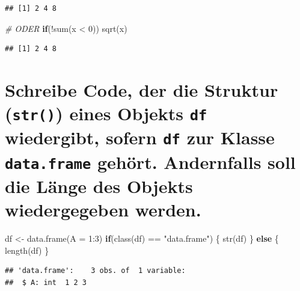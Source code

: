 \documentclass[12pt,a4paper]{article}
\newenvironment{Shaded}{\begin{snugshade}}{\end{snugshade}}
\newcommand{\AttributeTok}[1]{\textcolor[rgb]{0.77,0.63,0.00}{#1}}
\newcommand{\CommentTok}[1]{\textcolor[rgb]{0.56,0.35,0.01}{\textit{#1}}}
\newcommand{\ControlFlowTok}[1]{\textcolor[rgb]{0.13,0.29,0.53}{\textbf{#1}}}
\newcommand{\DecValTok}[1]{\textcolor[rgb]{0.00,0.00,0.81}{#1}}
\newcommand{\FunctionTok}[1]{\textcolor[rgb]{0.00,0.00,0.00}{#1}}
\newcommand{\NormalTok}[1]{#1}
\newcommand{\OtherTok}[1]{\textcolor[rgb]{0.56,0.35,0.01}{#1}}
\newcommand{\SpecialCharTok}[1]{\textcolor[rgb]{0.00,0.00,0.00}{#1}}
\newcommand{\StringTok}[1]{\textcolor[rgb]{0.31,0.60,0.02}{#1}}
\begin{document}
\begin{verbatim}
## [1] 2 4 8
\end{verbatim}

\begin{Shaded}
\begin{Highlighting}[]
    \CommentTok{\# ODER}
    \ControlFlowTok{if}\NormalTok{(}\SpecialCharTok{!}\FunctionTok{sum}\NormalTok{(x }\SpecialCharTok{\textless{}} \DecValTok{0}\NormalTok{)) }\FunctionTok{sqrt}\NormalTok{(x)}
\end{Highlighting}
\end{Shaded}

\begin{verbatim}
## [1] 2 4 8
\end{verbatim}

\hypertarget{schreibe-code-der-die-struktur-eines-objekts-wiedergibt-sofern-zur-klasse-gehuxf6rt.-andernfalls-soll-die-luxe4nge-des-objekts-wiedergegeben-werden.}{%
\section{\texorpdfstring{Schreibe Code, der die Struktur
(\texttt{str()}) eines Objekts \texttt{df} wiedergibt, sofern
\texttt{df} zur Klasse \texttt{data.frame} gehört. Andernfalls soll die
Länge des Objekts wiedergegeben
werden.}{Schreibe Code, der die Struktur () eines Objekts  wiedergibt, sofern  zur Klasse  gehört. Andernfalls soll die Länge des Objekts wiedergegeben werden.}}\label{schreibe-code-der-die-struktur-eines-objekts-wiedergibt-sofern-zur-klasse-gehuxf6rt.-andernfalls-soll-die-luxe4nge-des-objekts-wiedergegeben-werden.}}

\begin{Shaded}
\begin{Highlighting}[]
\NormalTok{    df }\OtherTok{\textless{}{-}} \FunctionTok{data.frame}\NormalTok{(}\AttributeTok{A =} \DecValTok{1}\SpecialCharTok{:}\DecValTok{3}\NormalTok{)}
    \ControlFlowTok{if}\NormalTok{(}\FunctionTok{class}\NormalTok{(df) }\SpecialCharTok{==} \StringTok{"data.frame"}\NormalTok{) \{}
      \FunctionTok{str}\NormalTok{(df)}
\NormalTok{    \} }\ControlFlowTok{else}\NormalTok{ \{}
      \FunctionTok{length}\NormalTok{(df)}
\NormalTok{    \}}
\end{Highlighting}
\end{Shaded}

\begin{verbatim}
## 'data.frame':    3 obs. of  1 variable:
##  $ A: int  1 2 3
\end{verbatim}
\end{document}
